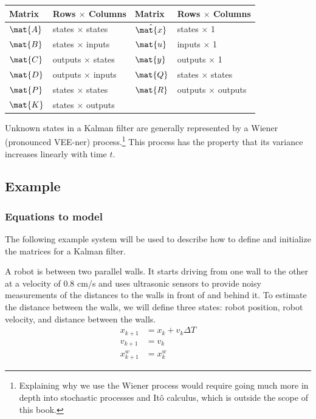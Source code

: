 \begin{booktable}
  \begin{tabular}{|ll|ll|}
    \hline
    \rowcolor{headingbg}
    \textbf{Matrix} & \textbf{Rows $\times$ Columns} &
    \textbf{Matrix} & \textbf{Rows $\times$ Columns} \\
    \hline
    $\mat{A}$ & states $\times$ states & $\hat{\mat{x}}$ & states $\times$ 1 \\
    $\mat{B}$ & states $\times$ inputs & $\mat{u}$ & inputs $\times$ 1 \\
    $\mat{C}$ & outputs $\times$ states & $\mat{y}$ & outputs $\times$ 1 \\
    $\mat{D}$ & outputs $\times$ inputs & $\mat{Q}$ & states $\times$ states \\
    $\mat{P}$ & states $\times$ states & $\mat{R}$ & outputs $\times$ outputs \\
    $\mat{K}$ & states $\times$ outputs & &
      \\
    \hline
  \end{tabular}
  \caption{Kalman filter matrix dimensions}
\end{booktable}

Unknown \glspl{state} in a Kalman filter are generally represented by a Wiener
(pronounced VEE-ner) process.\footnote{Explaining why we use the Wiener process
would require going much more in depth into stochastic processes and It\^{o}
calculus, which is outside the scope of this book.} This process has the
property that its variance increases linearly with time $t$.

\subsection{Example}

\subsubsection{Equations to model}

The following example \gls{system} will be used to describe how to define and
initialize the matrices for a Kalman filter.

A robot is between two parallel walls. It starts driving from one wall to the
other at a velocity of $0.8$ cm/s and uses ultrasonic sensors to provide noisy
measurements of the distances to the walls in front of and behind it. To
estimate the distance between the walls, we will define three \glspl{state}:
robot position, robot velocity, and distance between the walls.
\begin{align}
  x_{k+1} &= x_k + v_k \Delta T \\
  v_{k+1} &= v_k \\
  x_{k+1}^w &= x_k^w
\end{align}

